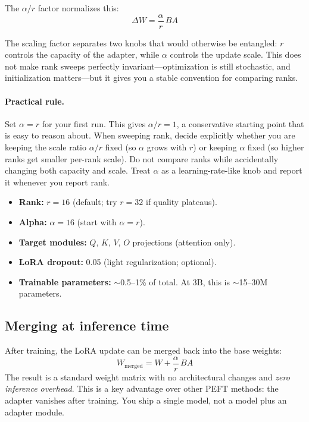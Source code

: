 The $\alpha/r$ factor normalizes this:
\[
\Delta W = \frac{\alpha}{r}\, BA
\]

The scaling factor separates two knobs that would otherwise be entangled: $r$ controls the capacity of the adapter, while $\alpha$ controls the update scale. This does not make rank sweeps perfectly invariant---optimization is still stochastic, and initialization matters---but it gives you a stable convention for comparing ranks.

\paragraph{Practical rule.} Set $\alpha = r$ for your first run. This gives $\alpha/r = 1$, a conservative starting point that is easy to reason about. When sweeping rank, decide explicitly whether you are keeping the scale ratio $\alpha/r$ fixed (so $\alpha$ grows with $r$) or keeping $\alpha$ fixed (so higher ranks get smaller per-rank scale). Do not compare ranks while accidentally changing both capacity and scale. Treat $\alpha$ as a learning-rate-like knob and report it whenever you report rank.

\begin{tcolorbox}[colback=orange!5, colframe=orange!60, title=\textbf{For Project~3: LoRA Configuration}]
\begin{itemize}[nosep]
  \item \textbf{Rank:} $r = 16$ (default; try $r = 32$ if quality plateaus).
  \item \textbf{Alpha:} $\alpha = 16$ (start with $\alpha = r$).
  \item \textbf{Target modules:} $Q$, $K$, $V$, $O$ projections (attention only).
  \item \textbf{LoRA dropout:} 0.05 (light regularization; optional).
  \item \textbf{Trainable parameters:} $\sim$0.5--1\% of total. At 3B, this is $\sim$15--30M parameters.
\end{itemize}
\end{tcolorbox}

\subsection{Merging at inference time}

After training, the LoRA update can be merged back into the base weights:
\[
W_{\text{merged}} = W + \frac{\alpha}{r}\, BA
\]
The result is a standard weight matrix with no architectural changes and \emph{zero inference overhead}. This is a key advantage over other PEFT methods: the adapter vanishes after training. You ship a single model, not a model plus an adapter module.

